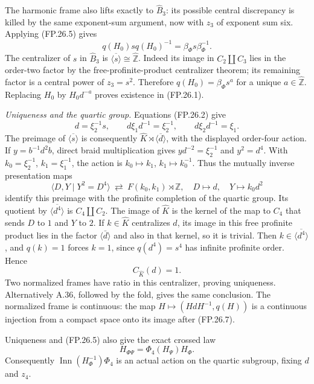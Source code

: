 The harmonic frame also lifts exactly to $\widehat B_3$:
its possible central discrepancy is killed by the same exponent-sum
argument, now with $z_3$ of exponent sum six. Applying (FP.26.5) gives
\[
 q(H_0)sq(H_0)^{-1}=\beta_\Phi s\beta_\Phi^{-1}.
\]
The centralizer of $s$ in $\widehat B_3$ is
$\overline{\langle s\rangle}\cong\widehat{\mathbb Z}$.
Indeed its image in $C_2\amalg C_3$ lies in the order-two factor by
the free-profinite-product centralizer theorem; its remaining factor
is a central power of $z_3=s^2$. Therefore
$q(H_0)=\beta_\Phi s^a$ for a unique $a\in\widehat{\mathbb Z}$.
Replacing $H_0$ by $H_0d^{-a}$ proves existence in (FP.26.1).

\emph{Uniqueness and the quartic group.}
Equations (FP.26.2) give
\[
 d=\xi_2^{-1}s,\qquad
 d\xi_1d^{-1}=\xi_2^{-1},\qquad
 d\xi_2d^{-1}=\xi_1.
 \tag{FP.26.6}
\]
The preimage of $\overline{\langle s\rangle}$ is consequently
$\widehat K\rtimes\overline{\langle d\rangle}$, with the displayed
order-four action. If $y=b^{-1}d^2b$, direct braid multiplication gives
$yd^{-2}=\xi_2^{-1}$ and $y^2=d^4$. With
$k_0=\xi_2^{-1}$, $k_1=\xi_1^{-1}$, the action is
$k_0\mapsto k_1$, $k_1\mapsto k_0^{-1}$.
Thus the mutually inverse presentation maps
\[
 \langle D,Y\mid Y^2=D^4\rangle
 \ \rightleftarrows\ F(k_0,k_1)\rtimes\mathbb Z,
 \quad D\longmapsto d,\quad Y\longmapsto k_0d^2
\]
identify this preimage with the profinite completion of the quartic
group. Its quotient by $\overline{\langle d^4\rangle}$ is
$C_4\amalg C_2$. The image of $\widehat K$ is the kernel of the
map to $C_4$ that sends $D$ to $1$ and $Y$ to $2$.
If $k\in\widehat K$ centralizes $d$, its image in this free profinite
product lies in the factor $\langle\bar d\rangle$ and also in that
kernel, so it is trivial. Then $k\in\overline{\langle d^4\rangle}$,
and $q(k)=1$ forces $k=1$, since $q(d^4)=s^4$ has infinite
profinite order. Hence
\[
 C_{\widehat K}(d)=1.
 \tag{FP.26.7}
\]
Two normalized frames have ratio in this centralizer, proving uniqueness.
Alternatively A.36, followed by the fold, gives the same conclusion.
The normalized frame is continuous: the map
$H\mapsto(HdH^{-1},q(H))$ is a continuous injection from a compact
space onto its image after (FP.26.7).

Uniqueness and (FP.26.5) also give the exact crossed law
\[
 H_{\Phi\Psi}=\Phi_4(H_\Psi)H_\Phi.
\]
Consequently $\operatorname{Inn}(H_\Phi^{-1})\Phi_4$ is an actual
action on the quartic subgroup, fixing $d$ and $z_4$.

